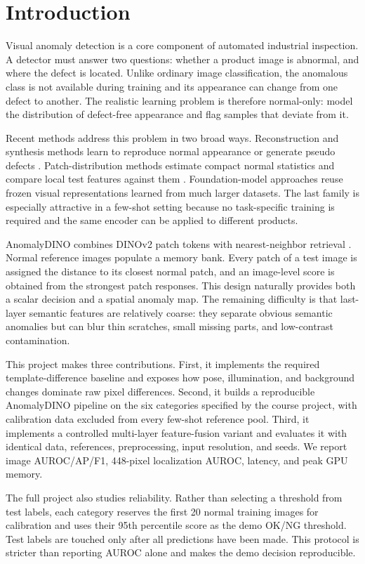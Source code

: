 \section{Introduction}

Visual anomaly detection is a core component of automated industrial
inspection. A detector must answer two questions: whether a product image is
abnormal, and where the defect is located. Unlike ordinary image
classification, the anomalous class is not available during training and its
appearance can change from one defect to another. The realistic learning
problem is therefore normal-only: model the distribution of defect-free
appearance and flag samples that deviate from it.

Recent methods address this problem in two broad ways. Reconstruction and
synthesis methods learn to reproduce normal appearance or generate pseudo
defects \cite{zavrtanik2021draem,li2021cutpaste}. Patch-distribution methods
estimate compact normal statistics and compare local test features against
them \cite{defard2021padim,roth2022patchcore}. Foundation-model approaches
reuse frozen visual representations learned from much larger datasets. The
last family is especially attractive in a few-shot setting because no
task-specific training is required and the same encoder can be applied to
different products.

AnomalyDINO combines DINOv2 patch tokens with nearest-neighbor retrieval
\cite{damm2025anomalydino,oquab2024dinov2}. Normal reference images populate a
memory bank. Every patch of a test image is assigned the distance to its
closest normal patch, and an image-level score is obtained from the strongest
patch responses. This design naturally provides both a scalar decision and a
spatial anomaly map. The remaining difficulty is that last-layer semantic
features are relatively coarse: they separate obvious semantic anomalies but
can blur thin scratches, small missing parts, and low-contrast contamination.

This project makes three contributions. First, it implements the required
template-difference baseline and exposes how pose, illumination, and
background changes dominate raw pixel differences. Second, it builds a
reproducible AnomalyDINO pipeline on the six categories specified by the course
project, with calibration data excluded from every few-shot reference pool.
Third, it implements a controlled multi-layer feature-fusion variant and
evaluates it with identical data, references, preprocessing, input resolution,
and seeds. We report image AUROC/AP/F1, 448-pixel localization AUROC, latency,
and peak GPU memory.

The full project also studies reliability. Rather than selecting a threshold
from test labels, each category reserves the first 20 normal training images
for calibration and uses their 95th percentile score as the demo OK/NG
threshold. Test labels are touched only after all predictions have been made.
This protocol is stricter than reporting AUROC alone and makes the demo
decision reproducible.
